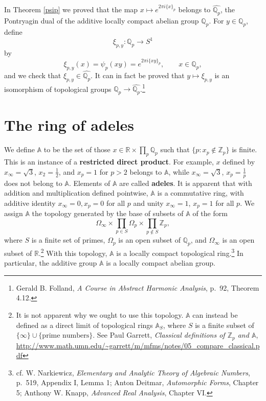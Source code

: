 \documentclass{article}
\theoremstyle{definition}
\begin{document}
In Theorem \ref{psip} we proved that the map $x \mapsto e^{2\pi i\{x\}_p}$ belongs to $\widehat{\mathbb{Q}_p}$, the Pontryagin
dual of the additive locally compact abelian group $\mathbb{Q}_p$.
For $y \in \mathbb{Q}_p$, define
\[
\xi_{p,y}:\mathbb{Q}_p \to S^1
\]
 by
 \[
 \xi_{p,y}(x)=\psi_p(xy) = e^{2\pi i\{xy\}_p}, \qquad x \in \mathbb{Q}_p,
 \]
  and we check that $\xi_{p,y} \in \widehat{\mathbb{Q}_p}$.
It can in fact be proved that  $y \mapsto \xi_{p,y}$ is an isomorphism of topological
groups
$\mathbb{Q}_p \to \widehat{\mathbb{Q}_p}$.\footnote{Gerald B. Folland, {\em A Course in Abstract Harmonic Analysis},
p.~92, Theorem 4.12.}




\section{The ring of adeles}
We define $\mathbb{A}$ to be the set of those
$x \in \mathbb{R} \times \prod_p \mathbb{Q}_p$ such that
$\{p: x_p \not \in \mathbb{Z}_p\}$ is finite. This is an instance of a \textbf{restricted direct product}. For example, 
$x$ defined by $x_\infty=\sqrt{3}$, $x_2=\frac{1}{2}$, and $x_p=1$ for $p>2$ belongs to 
$\mathbb{A}$, while $x_\infty=\sqrt{3}$, $x_p=\frac{1}{p}$ does not belong to $\mathbb{A}$. Elements
of $\mathbb{A}$ are called \textbf{adeles}. It is apparent that with addition and multiplication defined pointwise,
$\mathbb{A}$ is a commutative ring, with additive identity $x_\infty=0, x_p=0$ for all $p$ and unity
$x_\infty=1$, $x_p=1$ for all $p$.
We assign $\mathbb{A}$ the topology generated by the base of subsets of $\mathbb{A}$ of the form
\[
\Omega_\infty \times \prod_{p \in S} \Omega_p \times \prod_{p \not \in S} \mathbb{Z}_p,
\]
where
$S$ is a finite set of primes, $\Omega_p$ is an open subset of $\mathbb{Q}_p$, and $\Omega_\infty$ is an open subset
of $\mathbb{R}$.\footnote{It is not apparent why we ought to use this topology. $\mathbb{A}$ can instead
be defined as a direct limit of topological rings $\mathbb{A}_S$, where $S$ is a finite subset of
$\{\infty\} \cup \{\textrm{prime numbers}\}$. See Paul Garrett,
{\em Classical definitions of $\mathbb{Z}_p$ and $\mathbb{A}$},
\url{http://www.math.umn.edu/~garrett/m/mfms/notes/05_compare_classical.pdf}}
With this topology, $\mathbb{A}$ is a locally compact topological ring.\footnote{cf. W.
 Narkiewicz, {\em Elementary and Analytic Theory of Algebraic Numbers}, p.~519, Appendix  I, Lemma 1; Anton Deitmar, {\em Automorphic Forms}, Chapter 5;
 Anthony W. Knapp, {\em Advanced Real Analysis}, Chapter VI.}
 In particular, the additive group $\mathbb{A}$ is a locally compact abelian group. 
\end{document}
